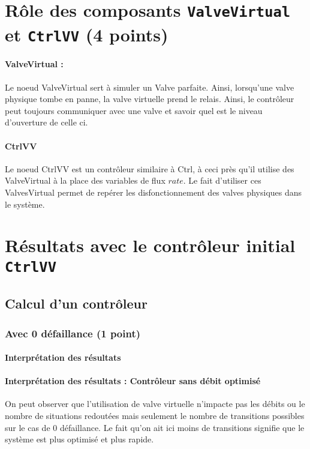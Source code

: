 \documentclass[a4paper]{book}
\begin{document}
\section{Rôle des composants {\tt ValveVirtual} et {\tt CtrlVV} (4 points)}
\paragraph{ValveVirtual : }
Le noeud ValveVirtual sert à simuler un Valve parfaite. Ainsi, lorsqu'une valve physique tombe en panne, la valve virtuelle prend le relais. Ainsi, le contrôleur peut toujours communiquer avec une valve et savoir quel est le niveau d'ouverture de celle ci.

\paragraph{CtrlVV}
Le noeud CtrlVV est un contrôleur similaire à Ctrl, à ceci près qu'il utilise des ValveVirtual à la place des variables de flux $rate$.
Le fait d'utiliser ces ValvesVirtual permet de repérer les disfonctionnement des valves physiques dans le système.

\section{Résultats avec le contrôleur initial {\tt CtrlVV}}
\subsection{Calcul d'un contrôleur}
\subsubsection{Avec 0 défaillance (1 point)}


%
%
%
\paragraph{Interprétation des résultats}
\paragraph{Interprétation des résultats : Contrôleur sans débit optimisé}
On peut observer que l'utilisation de valve virtuelle n'impacte pas les débits ou le nombre de situations redoutées mais seulement le nombre de transitions possibles sur le cas de 0 défaillance.
Le fait qu'on ait ici moins de transitions signifie que le système est plus optimisé et plus rapide.
\end{document}
